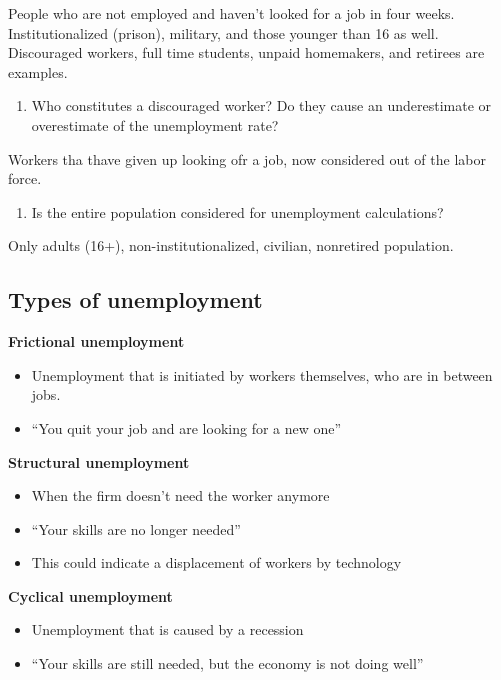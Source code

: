 \documentclass[
  letterpaper,
  DIV=11,
  numbers=noendperiod]{scrartcl}
\providecommand{\tightlist}{%
  \setlength{\itemsep}{0pt}\setlength{\parskip}{0pt}}\usepackage{longtable,booktabs,array}
\begin{document}
People who are not employed and haven't looked for a job in four weeks.
Institutionalized (prison), military, and those younger than 16 as well.
Discouraged workers, full time students, unpaid homemakers, and retirees
are examples.

\begin{enumerate}
\def\labelenumi{\arabic{enumi}.}
\setcounter{enumi}{3}
\tightlist
\item
  Who constitutes a discouraged worker? Do they cause an underestimate
  or overestimate of the unemployment rate?
\end{enumerate}

Workers tha thave given up looking ofr a job, now considered out of the
labor force.

\begin{enumerate}
\def\labelenumi{\arabic{enumi}.}
\setcounter{enumi}{4}
\tightlist
\item
  Is the entire population considered for unemployment calculations?
\end{enumerate}

Only adults (16+), non-institutionalized, civilian, nonretired
population.

\subsection{Types of unemployment}\label{types-of-unemployment}

\textbf{Frictional unemployment}

\begin{itemize}
\tightlist
\item
  Unemployment that is initiated by workers themselves, who are in
  between jobs.
\item
  ``You quit your job and are looking for a new one''
\end{itemize}

\textbf{Structural unemployment}

\begin{itemize}
\tightlist
\item
  When the firm doesn't need the worker anymore
\item
  ``Your skills are no longer needed''
\item
  This could indicate a displacement of workers by technology
\end{itemize}

\textbf{Cyclical unemployment}

\begin{itemize}
\tightlist
\item
  Unemployment that is caused by a recession
\item
  ``Your skills are still needed, but the economy is not doing well''
\end{itemize}
\end{document}
